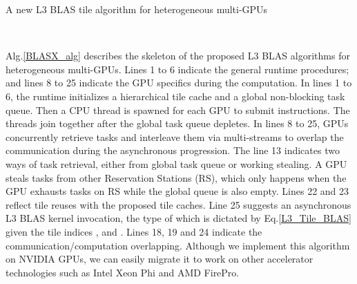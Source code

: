 \documentclass[conference]{IEEEtran}
\begin{document}
\vspace{-0.1in}
\begin{algorithm}
\caption{A new L3 BLAS tile algorithm for heterogeneous multi-GPUs}
\label{BLASX_alg}
\DontPrintSemicolon
{}
\KwResult{}
\Begin{
\\
\\
	\For{} {
	    \\
	}
	
}
\hfill \\
\end{algorithm}
\vspace{-0.15in}

Alg.\ref{BLASX_alg} describes the skeleton of the proposed L3 BLAS algorithms for heterogeneous 
multi-GPUs. Lines 1 to 6 indicate the general runtime procedures; and 
lines 8 to 25 indicate the GPU specifics during the computation. In lines 1 to 6, the runtime 
initializes a hierarchical tile cache and a global non-blocking task queue. Then 
a CPU thread is spawned for each GPU to submit instructions. The threads join together 
after the global task queue depletes. In lines 8 to 25, GPUs concurrently retrieve tasks
and interleave them via multi-streams to overlap the communication during the asynchronous progression. 
The line 13 indicates two ways of task retrieval, either from global task queue or working stealing.
A GPU steals tasks from other Reservation Stations (RS), which only happens when the GPU 
exhausts tasks on RS while the global queue is also empty. Lines 22 and 23 reflect tile reuses with 
the proposed tile caches. Line 25 suggests an asynchronous L3 BLAS kernel invocation, 
the type of which is dictated by Eq.\ref{L3_Tile_BLAS} given the tile indices , 
 and . Lines 18, 19 and 24 indicate the communication/computation overlapping.
Although we implement this algorithm on NVIDIA GPUs, we can easily migrate it to work on 
other accelerator technologies such as Intel Xeon Phi and AMD FirePro.
\end{document}
